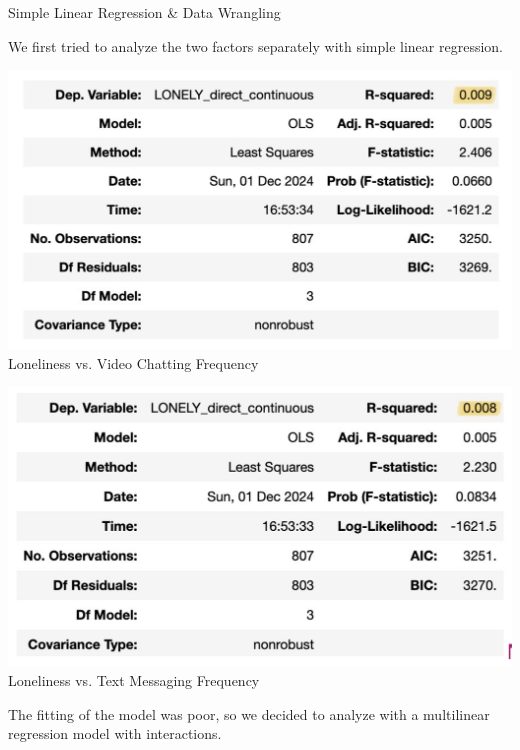 \documentclass{beamer}
\begin{document}
\begin{frame}{ Simple Linear Regression \& Data Wrangling} %

\small %
We first tried to analyze the two factors separately with simple linear regression.\\

\vspace{0.5em} %

\begin{minipage}[t]{0.49\linewidth}
    \centering
    \includegraphics[width=\linewidth]{presentation/Screenshot 2024-12-01 at 12.01.04 PM.png}\\
    Loneliness vs. Video Chatting Frequency
\end{minipage}%
\hfill%
\begin{minipage}[t]{0.49\linewidth}
    \centering
    \includegraphics[width=\linewidth]{presentation/Screenshot 2024-12-01 at 12.01.09 PM.png}\\
    Loneliness vs. Text Messaging Frequency
\end{minipage}

\vspace{0.5em} %

The fitting of the model was poor, so we decided to analyze with a multilinear regression model with interactions.\\

\end{frame}
\end{document}

